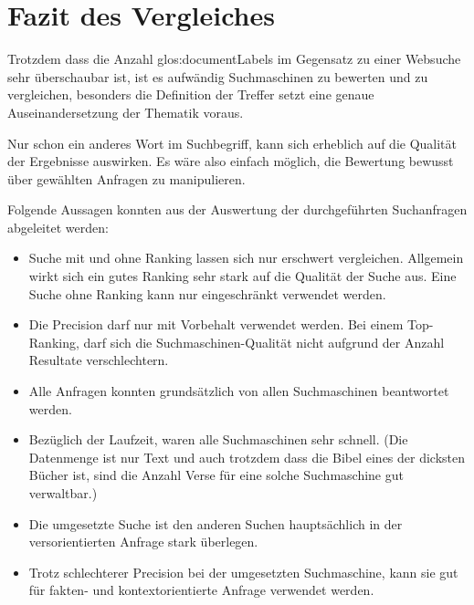 \newpage
\section{Fazit des Vergleiches}
Trotzdem dass die Anzahl \glspl{glos:documentLabel} im Gegensatz zu einer Websuche sehr überschaubar ist, ist es aufwändig Suchmaschinen zu bewerten und zu vergleichen, besonders die Definition der Treffer setzt eine genaue Auseinandersetzung der Thematik voraus.

Nur schon ein anderes Wort im Suchbegriff, kann sich erheblich auf die Qualität der Ergebnisse auswirken. Es wäre also einfach möglich, die Bewertung bewusst über gewählten Anfragen zu manipulieren.

Folgende Aussagen konnten aus der Auswertung der durchgeführten Suchanfragen abgeleitet werden:
\begin{itemize}[noitemsep]
	\item Suche mit und ohne Ranking lassen sich nur erschwert vergleichen. Allgemein wirkt sich ein gutes Ranking sehr stark auf die Qualität der Suche aus. Eine Suche ohne Ranking kann nur eingeschränkt verwendet werden.
	
	\item Die Precision darf nur mit Vorbehalt verwendet werden.
	Bei einem Top-Ranking, darf sich die Suchmaschinen-Qualität nicht aufgrund der Anzahl Resultate verschlechtern.
	
	\item Alle Anfragen konnten grundsätzlich von allen Suchmaschinen beantwortet werden.

	\item Bezüglich der Laufzeit, waren alle Suchmaschinen sehr schnell. (Die Datenmenge ist nur Text und auch trotzdem dass die Bibel eines der dicksten Bücher ist, sind die Anzahl Verse für eine solche Suchmaschine gut verwaltbar.)
	
	\item Die umgesetzte Suche ist den anderen Suchen hauptsächlich in der versorientierten Anfrage stark überlegen.
	
	\item Trotz schlechterer Precision bei der umgesetzten Suchmaschine, kann sie gut für fakten- und kontextorientierte Anfrage verwendet werden.

\end{itemize}



